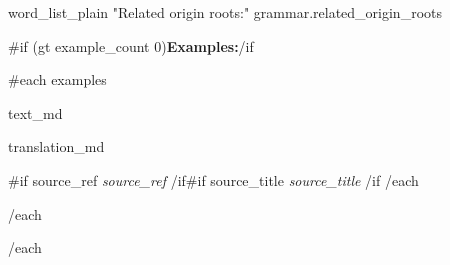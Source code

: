 \documentclass[11pt, a4paper, landscape, oneside, twocolumn]{memoir}
\begin{document}
{{{word_list_plain "Related origin roots:" grammar.related_origin_roots}}

{{#if (gt example_count 0)}}\textbf{Examples:}{{/if}}

{{#each examples}}

{{text_md}}

{{translation_md}}

{{#if source_ref}}
\textit{%
{{source_ref}}%
}{{/if}}{{#if source_title}}
\textit{%
 {{source_title}}%
}
{{/if}}
{{/each}}

{{/each}}

{{/each}}%

}%

\end{document}

